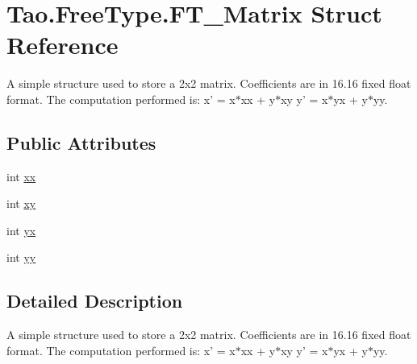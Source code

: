 \hypertarget{struct_tao_1_1_free_type_1_1_f_t___matrix}{
\section{Tao.FreeType.FT\_\-Matrix Struct Reference}
\label{struct_tao_1_1_free_type_1_1_f_t___matrix}
}


A simple structure used to store a 2x2 matrix. Coefficients are in 16.16 fixed float format. The computation performed is: x' = x$\ast$xx + y$\ast$xy y' = x$\ast$yx + y$\ast$yy.  


\subsection*{Public Attributes}
\begin{DoxyCompactItemize}
\item 
int \hyperlink{struct_tao_1_1_free_type_1_1_f_t___matrix_a015a0727c05977ffb1a1fe7eb87d1728}{xx}
\item 
int \hyperlink{struct_tao_1_1_free_type_1_1_f_t___matrix_a51feca80fb49e326e0b36b5f425e3dcd}{xy}
\item 
int \hyperlink{struct_tao_1_1_free_type_1_1_f_t___matrix_a1f79d52747b8d059bff7f9c270a9eb96}{yx}
\item 
int \hyperlink{struct_tao_1_1_free_type_1_1_f_t___matrix_ad60423063006cf6072825d474678a013}{yy}
\end{DoxyCompactItemize}


\subsection{Detailed Description}
A simple structure used to store a 2x2 matrix. Coefficients are in 16.16 fixed float format. The computation performed is: x' = x$\ast$xx + y$\ast$xy y' = x$\ast$yx + y$\ast$yy. 

